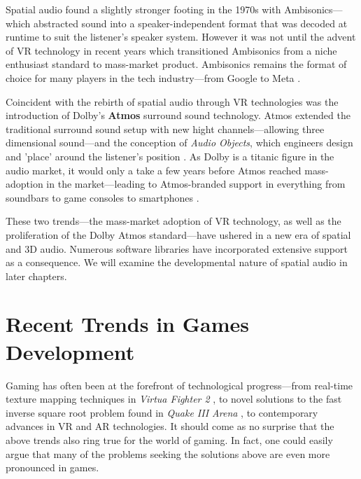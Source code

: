 \documentclass{report}
\newcommand{\tech}[1]{\textbf{#1}}
\begin{document}
Spatial audio found a slightly stronger footing in the 1970s with Ambisonics---which abstracted sound into a speaker-independent format that was decoded at runtime to suit the listener's speaker system. However it was not until the advent of VR technology in recent years which transitioned Ambisonics from a niche enthusiast standard to mass-market product. Ambisonics remains the format of choice for many players in the tech industry---from Google to Meta \cite{Google_2024}\cite{MetaPlatforms2024}. 

Coincident with the rebirth of spatial audio through VR technologies was the introduction of Dolby's \tech{Atmos} surround sound technology. Atmos extended the traditional surround sound setup with new hight channels---allowing three dimensional sound---and the conception of \emph{Audio Objects}, which engineers design and 'place' around the listener's position \cite{Dolby_Laboratories_2016}. As Dolby is a titanic figure in the audio market, it would only a take a few years before Atmos reached mass-adoption in the market---leading to Atmos-branded support in everything from soundbars to game consoles to smartphones \cite{Cox_2020}. 

These two trends---the mass-market adoption of VR technology, as well as the proliferation of the Dolby Atmos standard---have ushered in a new era of spatial and 3D audio. Numerous software libraries have incorporated extensive support as a consequence. We will examine the developmental nature of spatial audio in later chapters.   


\section{Recent Trends in Games Development}

Gaming has often been at the forefront of technological progress---from real-time texture mapping techniques in \emph{Virtua Fighter 2} \cite{liboa2020hardware}, to novel solutions to the fast inverse square root problem found in \emph{Quake III Arena} \cite{lomont2003fast}, to contemporary advances in VR and AR technologies. It should come as no surprise that the above trends also ring true for the world of gaming. In fact, one could easily argue that many of the problems seeking the solutions above are even more pronounced in games. 
\end{document}
